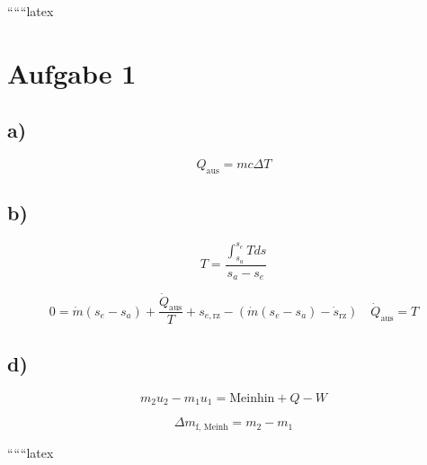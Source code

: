 
``````latex


\section*{Aufgabe 1}

\subsection*{a)}
\[
Q_{\text{aus}} = mc \Delta T
\]

\subsection*{b)}
\[
T = \frac{\int_{s_a}^{s_e} T ds}{s_a - s_e}
\]

\[
0 = \dot{m} (s_e - s_a) + \frac{\dot{Q}_{\text{aus}}}{T} + s_{e, \text{rz}} - \left( \dot{m} (s_e - s_a) - \dot{s}_{\text{rz}} \right) \quad \dot{Q}_{\text{aus}} = T
\]

\subsection*{d)}
\[
m_2 u_2 - m_1 u_1 = \text{Meinhin} + Q - W
\]

\[
\Delta m_{\text{f, Meinh}} = m_2 - m_1
\]

``````latex


